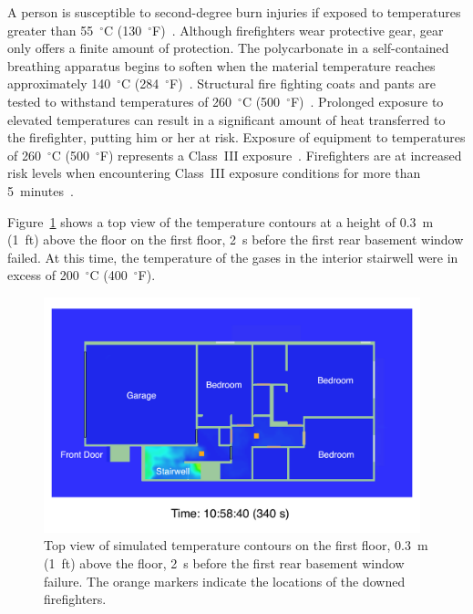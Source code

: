 \documentclass[12pt,oneside]{book}
\begin{document}
A person is susceptible to second-degree burn injuries if exposed to temperatures greater than 55~$^{\circ}$C (130~$^{\circ}$F)~\cite{contactburn}. Although firefighters wear protective gear, gear only offers a finite amount of protection. The polycarbonate in a self-contained breathing apparatus begins to soften when the material temperature reaches approximately 140~$^{\circ}$C (284~$^{\circ}$F)~\cite{mensch2011emergency}. Structural fire fighting coats and pants are tested to withstand temperatures of 260~$^{\circ}$C (500~$^{\circ}$F)~\cite{nfpa2013standard}. Prolonged exposure to elevated temperatures can result in a significant amount of heat transferred to the firefighter, putting him or her at risk. Exposure of equipment to temperatures of 260~$^{\circ}$C (500~$^{\circ}$F) represents a Class~III exposure~\cite{Donnelly2006}. Firefighters are at increased risk levels when encountering Class~III exposure conditions for more than 5~minutes~\cite{Donnelly2006}.

Figure~\ref{fig:smv_flow_path_top_1} shows a top view of the temperature contours at a height of 0.3~m (1~ft) above the floor on the first floor, 2~s before the first rear basement window failed. At this time, the temperature of the gases in the interior stairwell were in excess of 200~$^{\circ}$C (400~$^{\circ}$F).

\begin{figure}[!ht]
\includegraphics[width=4.3in]{../Figures/SMV_Top_Temp_340_s}


\caption[Simulated temperature contours on the first floor before basement window failure.]
{Top view of simulated temperature contours on the first floor, 0.3~m (1~ft) above the floor, 2~s before the first rear basement window failure. The orange markers indicate the locations of the downed firefighters.}
\label{fig:smv_flow_path_top_1}
\end{figure}
\end{document}
